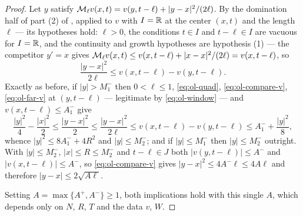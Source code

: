 \begin{proof}
Let $y$ satisfy $\mathcal{M}_\ell v(x,t)=v(y,t-\ell)+|y-x|^2/(2\ell)$. By the
domination half of part (2) of , applied to
$v$ with $I=\mathbb{R}$ at the center $(x,t)$ and the length $\ell$ --- its hypotheses
hold: $\ell>0$, the conditions $t\in I$ and $t-\ell\in I$ are vacuous for
$I=\mathbb{R}$, and the continuity and growth hypotheses are hypothesis (1) --- the
competitor $y'=x$ gives
$\mathcal{M}_\ell v(x,t)\le v(x,t-\ell)+|x-x|^2/(2\ell)=v(x,t-\ell)$, so
\begin{equation}\label{eq:ol-compare-v}
  \frac{|y-x|^2}{2\ell}\le v(x,t-\ell)-v(y,t-\ell).
\end{equation}
Exactly as before, if $|y|>M^-_1$ then $0<\ell\le1$, \eqref{eq:ol-quad},
\eqref{eq:ol-compare-v}, \eqref{eq:ol-far-v} at $(y,t-\ell)$ --- legitimate by
\eqref{eq:ol-window} --- and $v(x,t-\ell)\le A^-_1$ give
\[
  \frac{|y|^2}{4}-\frac{|x|^2}{2}
   \le\frac{|y-x|^2}{2}
   \le\frac{|y-x|^2}{2\ell}
   \le v(x,t-\ell)-v(y,t-\ell)
   \le A^-_1+\frac{|y|^2}{8},
\]
whence $|y|^2\le8A^-_1+4R^2$ and $|y|\le M^-_2$; and if $|y|\le M^-_1$ then
$|y|\le M^-_2$ outright. With $|y|\le M^-_2$, $|x|\le R\le M^-_2$ and
$t-\ell\in J$ both $|v(y,t-\ell)|\le A^-$ and $|v(x,t-\ell)|\le A^-$, so
\eqref{eq:ol-compare-v} gives $|y-x|^2\le4A^-\ell\le4A\ell$ and therefore
$|y-x|\le2\sqrt{A\ell}$.

Setting $A=\max\{A^+,A^-\}\ge1$, both implications hold with this single $A$,
which depends only on $N$, $R$, $T$ and the data $v$, $W$. \end{proof}
